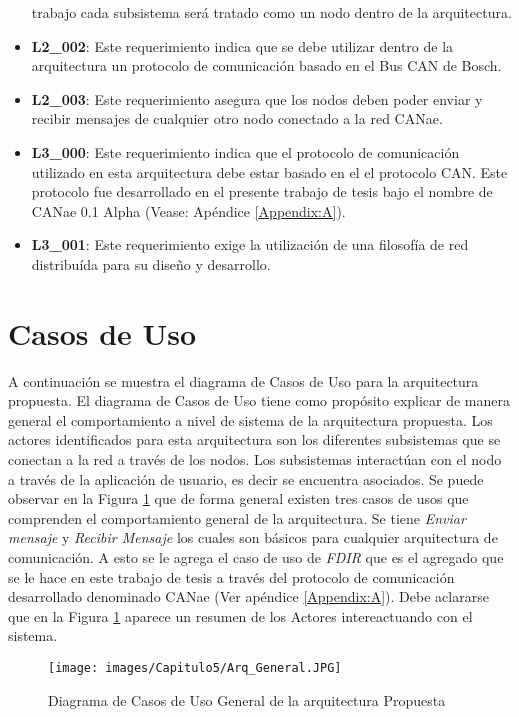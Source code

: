 \begin{itemize}
  trabajo cada subsistema será tratado como un nodo dentro de la arquitectura.
\item\textbf{L2\_002}: Este requerimiento indica que se debe utilizar dentro de
  la arquitectura un protocolo de comunicación basado en el Bus CAN de Bosch.
\item\textbf{L2\_003}: Este requerimiento asegura que los nodos deben poder enviar
  y recibir mensajes de cualquier otro nodo conectado a la red CANae.
\item\textbf{L3\_000}: Este requerimiento indica que el protocolo de
  comunicación utilizado en esta arquitectura debe estar basado en el
  el protocolo CAN. Este protocolo fue desarrollado en el presente
  trabajo de tesis bajo el nombre de CANae 0.1 Alpha (Vease: Apéndice \ref{Appendix:A}).
\item\textbf{L3\_001}: Este requerimiento exige la utilización de una
  filosofía de red distribuída para su diseño y desarrollo.
\end{itemize}

\section{Casos de Uso}
A continuación se muestra el diagrama de Casos de Uso para la arquitectura propuesta.
El diagrama de Casos de Uso tiene como propósito explicar de manera general
el comportamiento a nivel de sistema de la arquitectura propuesta.
Los actores identificados para esta arquitectura son los diferentes
subsistemas que se conectan a la red a través de los nodos.
Los subsistemas interactúan con el nodo a través de
la aplicación de usuario, es decir se encuentra asociados.
Se puede observar en la Figura \ref{fig:DiagramaCUArqPropuestaGENERAL}
que de forma general existen tres casos de usos que comprenden el comportamiento
general de la arquitectura. Se tiene \textit{Enviar mensaje} y \textit{Recibir
  Mensaje} los cuales son básicos para cualquier arquitectura de comunicación. A
esto se le agrega el caso de uso de \textit{FDIR} que es el agregado que se le
hace en este trabajo de tesis a través del protocolo de comunicación desarrollado
denominado CANae (Ver apéndice \ref{Appendix:A}). Debe aclararse que en 
la Figura \ref{fig:DiagramaCUArqPropuestaGENERAL}
aparece un resumen de los Actores intereactuando con el sistema. 

\begin{figure}[h!]
 \centering
 \texttt{[image: images/Capitulo5/Arq\_General.JPG]}
  \caption{Diagrama de Casos de Uso General de la arquitectura Propuesta}
\label{fig:DiagramaCUArqPropuestaGENERAL}
\end{figure} 

